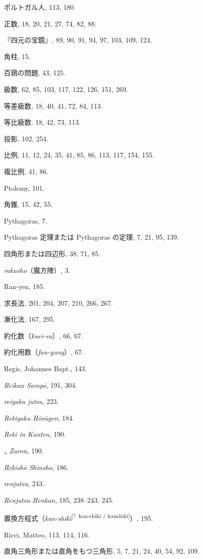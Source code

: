 \documentclass[11pt]{article}
\newcommand{\scanpage}[2]{\clearpage\setcounter{footnote}{0}\noindent{\footnotesize\color{gray}PDF #1 頁 · #2}\par\medskip}
\newcommand{\unclear}[1]{\textsuperscript{[?~#1]}}
\begin{document}
\scanpage{0355}{印刷頁 341}
ポルトガル人, 113, 180.\par
正数, 18, 20, 21, 27, 74, 82, 88.\par
『四元の宝鏡』, 89, 90, 91, 94, 97, 103, 109, 124.\par
角柱, 15.\par
百鶏の問題, 43, 125.\par
級数, 62, 85, 103, 117, 122, 126, 151, 269.\par
等差級数, 18, 40, 41, 72, 84, 113.\par
等比級数. 18, 42, 73, 113.\par
投影, 102, 254.\par
比例, 11, 12, 24, 35, 41, 85, 86, 113, 117, 154, 155.\par
複比例, 41, 86.\par
Ptolemy, 101.\par
角錐, 15, 42, 55.\par
Pythagoras, 7.\par
Pythagoras 定理または Pythagoras の定理, 7, 21, 95, 139.\par
\medskip
四角形または四辺形, 38, 71, 85.\par
\medskip
\emph{rakusho}（魔方陣）, 3.\par
Ran-yen, 185.\par
求長法, 201, 204, 207, 210, 266, 267.\par
漸化法, 167, 295.\par
約化数（\emph{kuei-su}）, 66, 67.\par
約化用数（\emph{fan-yung}）, 67.\par
Regis, Johannes Bapt., 143.\par
\emph{Reikan Sampō}, 191, 304.\par
\emph{reiyaku jutsu}, 223.\par
\emph{Rekigaku Hōsūgen}, 184.\par
\emph{Reki in Kunten}, 190.\par
\quad „ \emph{Zuron}, 190.\par
\emph{Rekishō Shinsho}, 186.\par
\emph{renjutsu}, 243.\par
\emph{Renjutsu Henkan}, 185, 238--243, 245.\par
置換方程式（\emph{kan-shiki}\unclear{kan-shiki / kanshiki}）, 195.\par
Ricci, Matteo, 113, 114, 116.\par
直角三角形または直角をもつ三角形, 5, 7, 21, 24, 40, 54, 92, 109.\par
\end{document}
